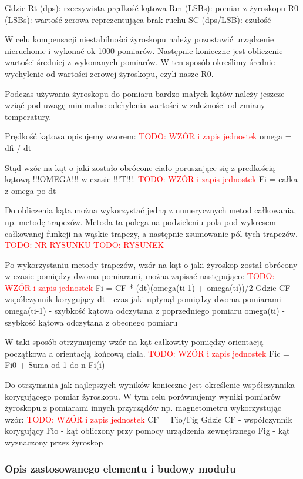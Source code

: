 Gdzie
 Rt (dps): rzeczywista prędkość kątowa
 Rm  (LSBs): pomiar z żyroskopu
 R0 (LSBs): wartość zerowa reprezentująca brak ruchu
 SC (dps/LSB): czułość

W celu kompensacji niestabilności żyroskopu należy pozostawić urządzenie nieruchome i wykonać ok 1000 pomiarów. Następnie
konieczne jest obliczenie wartości średniej z wykonanych pomiarów. W ten sposób określimy średnie wychylenie od wartości
zerowej żyroskopu, czyli nasze R0.

Podczas używania żyroskopu do pomiaru bardzo małych kątów należy jeszcze wziąć pod uwagę minimalne odchylenia wartości w
zależności od zmiany temperatury.

Prędkość kątowa opisujemy wzorem: 
\textcolor{red}{TODO: WZÓR i zapis jednostek}
omega = dfi / dt

Stąd wzór na kąt o jaki zostało obrócone ciało poruszające się z predkością kątową !!!OMEGA!!! w czasie !!!T!!!.
\textcolor{red}{TODO: WZÓR i zapis jednostek}
Fi = całka z omega po dt

Do obliczenia kąta można wykorzystać jedną z numerycznych metod całkowania, np. metodę trapezów.
Metoda ta polega na podzieleniu pola pod wykresem całkowanej funkcji na wąskie trapezy, a następnie
zsumowanie pól tych trapezów. \textcolor{red}{TODO: NR RYSUNKU}
\textcolor{red}{TODO: RYSUNEK}

Po wykorzystaniu metody trapezów, wzór na kąt o jaki żyroskop został obrócony w czasie pomiędzy dwoma pomiarami, 
można zapisać następująco:
\textcolor{red}{TODO: WZÓR i zapis jednostek}
Fi = CF * (dt)(omega(ti-1) + omega(ti))/2
Gdzie
 CF - współczynnik korygujący
 dt - czas jaki upłynął pomiędzy dwoma pomiarami
 omega(ti-1) - szybkość kątowa odczytana z poprzedniego pomiaru
 omega(ti) - szybkość kątowa odczytana z obecnego pomiaru

W taki sposób otrzymujemy wzór na kąt całkowity pomiędzy orientacją początkowa a orientacją końcową ciala.
\textcolor{red}{TODO: WZÓR i zapis jednostek}
Fic = Fi0 + Suma od 1 do n Fi(i) 

Do otrzymania jak najlepszych wyników konieczne jest określenie współczynnika korygującego pomiar żyroskopu.
W tym celu porównujemy wyniki pomiarów żyroskopu z pomiarami innych przyrządów np. magnetometru wykorzystując wzór:
\textcolor{red}{TODO: WZÓR i zapis jednostek}
CF = Fio/Fig
Gdzie
 CF - współczynnik korygujący
 Fio - kąt obliczony przy pomocy urządzenia zewnętrznego
 Fig - kąt wyznaczony przez żyroskop

\subsubsection{Opis zastosowanego elementu i budowy modułu}
